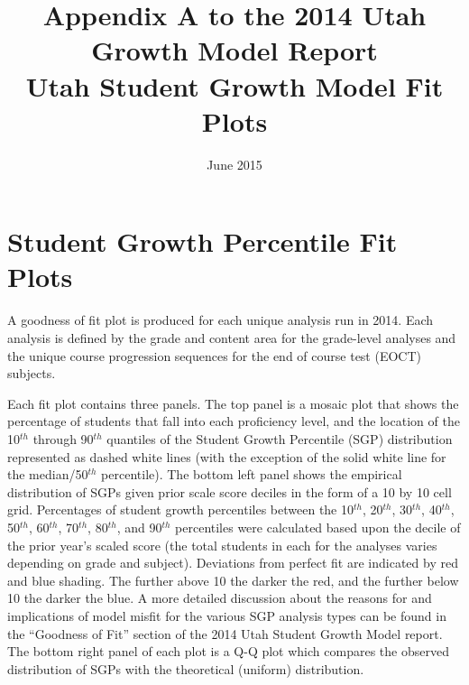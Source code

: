 \documentclass[12pt]{article}
\begin{document}
\newcommand{\pl}[1]{\textsf{PL#1}}
\newcommand{\Cov}{\ensuremath{\mbox{\textsf{Cov}}}}
\newcommand{\Diag}{\ensuremath{\mbox{\textsf{Diag}}}}
\newcommand{\Bias}{\ensuremath{\mbox{\textsf{Bias}}}}
\newcommand{\Astar}[1]{\ensuremath{#1^{^*}}}
\thispagestyle{plain}
\pagestyle{damian}

\title{\textsf{\LARGE Appendix A to the 2014 Utah Growth Model Report  \\\medskip Utah Student Growth Model Fit Plots }}
\author{}

 \date{June 2015} 

\maketitle

\newpage


\section{Student Growth Percentile Fit
Plots}\label{student-growth-percentile-fit-plots}

A goodness of fit plot is produced for each unique analysis run in 2014.
Each analysis is defined by the grade and content area for the
grade-level analyses and the unique course progression sequences for the
end of course test (EOCT) subjects.

Each fit plot contains three panels. The top panel is a mosaic plot that
shows the percentage of students that fall into each proficiency level,
and the location of the 10\(^{th}\) through 90\(^{th}\) quantiles of the
Student Growth Percentile (SGP) distribution represented as dashed white
lines (with the exception of the solid white line for the
median/50\(^{th}\) percentile). The bottom left panel shows the
empirical distribution of SGPs given prior scale score deciles in the
form of a 10 by 10 cell grid. Percentages of student growth percentiles
between the 10\(^{th}\), 20\(^{th}\), 30\(^{th}\), 40\(^{th}\),
50\(^{th}\), 60\(^{th}\), 70\(^{th}\), 80\(^{th}\), and 90\(^{th}\)
percentiles were calculated based upon the decile of the prior year's
scaled score (the total students in each for the analyses varies
depending on grade and subject). Deviations from perfect fit are
indicated by red and blue shading. The further above 10 the darker the
red, and the further below 10 the darker the blue. A more detailed
discussion about the reasons for and implications of model misfit for
the various SGP analysis types can be found in the ``Goodness of Fit''
section of the 2014 Utah Student Growth Model report. The bottom right
panel of each plot is a Q-Q plot which compares the observed
distribution of SGPs with the theoretical (uniform) distribution.
\end{document}
